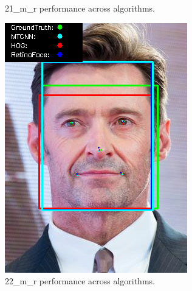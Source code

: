 \documentclass{l4proj}
\begin{document}
\begin{appendices}
\begin{figure}[h!]
\begin{minipage}{0.49\textwidth}
    \caption{21\_m\_r performance across algorithms.}
    \label{whoopi_result}
  \end{minipage}
\end{figure}

\begin{figure}[h!]
  \centering
  \begin{minipage}{0.49\textwidth}
    \centering
     \includegraphics[width=\textwidth]{images/appendix/22.png}
    \caption{22\_m\_r performance across algorithms.}
    \label{whoopi_result}
  \end{minipage}
    \hfill
    \begin{minipage}{0.49\textwidth}
    \centering

\end{minipage}
\end{figure}
\end{appendices}
\end{document}
